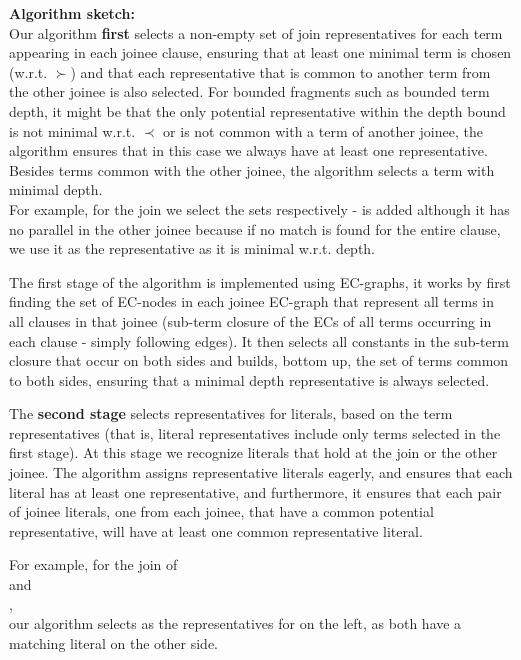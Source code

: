 \noindent
\textbf{Algorithm sketch:} \\
Our algorithm \textbf{first} selects a non-empty set of join representatives for each term appearing in each joinee clause,
ensuring that at least one minimal term is chosen (w.r.t. $\succ$) and that each representative that is common to another term from the other joinee is also selected. 
For bounded fragments such as bounded term depth, it might be that the only potential representative within the depth bound is not minimal w.r.t. $\prec$ or is not common with a term of another joinee, the algorithm ensures that in this case we always have at least one representative. Besides terms common with the other joinee, the algorithm selects a term with minimal depth.\\
For example, for the join  
we select the sets  respectively -  is added although it has no parallel in the other joinee because if no match is found for the entire clause, we use it as the representative as it is minimal w.r.t. depth.

The first stage of the algorithm is implemented using EC-graphs, it works by first finding the set of EC-nodes in each joinee EC-graph that represent all terms in all clauses in that joinee (sub-term closure of the ECs of all terms occurring in each clause - simply following \GFA{} edges). It then selects all constants in the sub-term closure that occur on both sides and builds, bottom up, the set of terms common to both sides, ensuring that a minimal depth representative is always selected.


The \textbf{second stage} selects representatives for literals, based on the term representatives (that is, literal representatives include only terms selected in the first stage). At this stage we recognize literals that hold at the join or the other joinee. 
The algorithm assigns representative literals eagerly, and ensures that each literal has at least one representative, 
and furthermore, it ensures that each pair of joinee literals, one from each joinee, that have a common potential representative,
will have at least one common representative literal.

For example, for the join of \\
 and \\
,\\
our algorithm selects  as the representatives for  on the left, as both have a matching literal on the other side.

